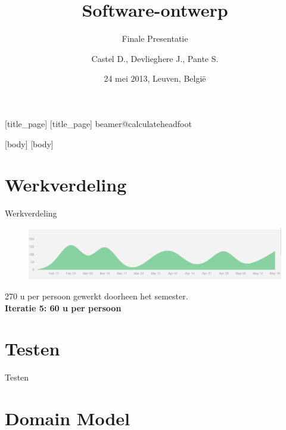 \documentclass[11pt,t]{beamer}
\title{Software-ontwerp}
\author{Castel D., Devlieghere J., Pante S.}
\institute{Groep 25, Computerwetenschappen, KU Leuven}
\subtitle{Finale Presentatie}
\date{24 mei 2013, Leuven, Belgi\"{e}}
\begin{document}
	[title_page]
	[title_page]
	\csname beamer@calculateheadfoot\endcsname %
		\begin{frame}
			\titlepage
		\end{frame}
	[body]
	[body]

\section{Werkverdeling}

\begin{frame}{Werkverdeling}
\vspace{0.3in}
\begin{center}
\begin{figure}
\includegraphics[width=0.9\linewidth]{images/contribution}
\end{figure}
\vspace{0.2in}
270 u per persoon gewerkt doorheen het semester.\\
\textbf{Iteratie 5:  60 u per persoon}
\end{center}

\end{frame}

\section{Testen}

\begin{frame}{Testen}
\end{frame}

\section{Domain Model}
\end{document}

